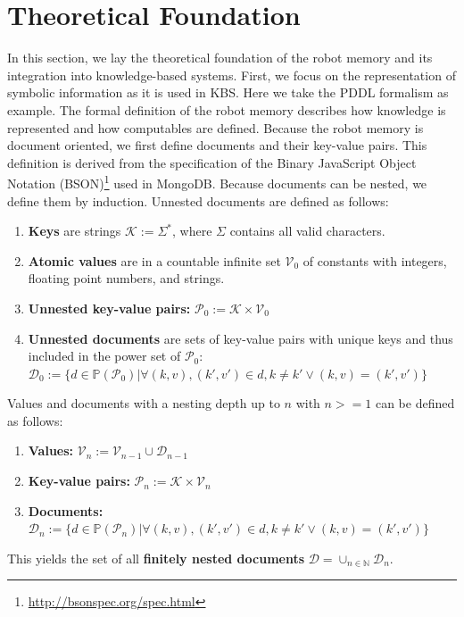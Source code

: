\section{Theoretical Foundation}
\label{sec:formalism}
In this section, we lay the theoretical foundation of the robot memory
and its integration into knowledge-based systems. First, we focus on
the representation of symbolic information as it is used in KBS. Here
we take the PDDL formalism as example. The formal definition of the
robot memory describes how knowledge is represented and how
computables are defined. Because the robot memory is document
oriented, we first define documents and their key-value pairs. This
definition is derived from the specification of the Binary JavaScript
Object Notation (BSON)\footnote{\url{http://bsonspec.org/spec.html}}
used in MongoDB.  Because documents can be nested, we define them by
induction. Unnested documents are defined as follows:
\begin{enumerate}
\item \textbf{Keys} are strings $\mathcal{K} := \Sigma^*$, where
  $\Sigma$ contains all valid characters.
\item  \textbf{Atomic values} are in a countable infinite set $\mathcal{V}_0$ of constants with
  integers, floating point numbers, and strings.
\item \textbf{Unnested key-value pairs:} $\mathcal{P}_0:=\mathcal{K}\times\mathcal{V}_0$
\item \textbf{Unnested documents} are sets of key-value pairs with
  unique keys and thus included in the power set of $\mathcal{P}_0$:\\
  $\mathcal{D}_0:=\{
  d\in\mathbb{P}(\mathcal{P}_0)|
  \forall (k,v),(k',v')\in d , k\neq k' \vee (k,v)=(k',v')
  \}$
\end{enumerate}
Values and documents with a nesting depth up to $n$ with $n>=1$ can be
defined as follows:
\begin{enumerate}
\item  \textbf{Values:} $\mathcal{V}_n := \mathcal{V}_{n-1} \cup \mathcal{D}_{n-1}$
\item \textbf{Key-value pairs:} $\mathcal{P}_n:=\mathcal{K}\times\mathcal{V}_n$
\item \textbf{Documents:}
  $\mathcal{D}_n:=\{
  d\in\mathbb{P}(\mathcal{P}_n)|
  \forall (k,v),(k',v')\in d , k\neq k' \vee (k,v)=(k',v')
  \}$
\end{enumerate}
This yields the set of all \textbf{finitely nested documents}
$\mathcal{D}=\cup_{n\in\mathbb{N}}\mathcal{D}_n$.
